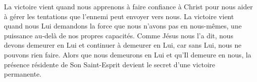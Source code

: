 La victoire vient quand nous apprenons à faire confiance à Christ
 pour nous aider à gérer les tentations que l'ennemi peut envoyer vers nous.
 La victoire vient quand nous Lui demandons la force
 que nous n'avons pas en nous-mêmes, une puissance au-delà
 de nos propres capacités.
 Comme Jésus nous l'a dit, nous devons demeurer en Lui
 et continuer à demeurer en Lui, car sans Lui, nous ne pouvons rien faire.
 Alors que nous demeurons en Lui et qu'Il demeure en nous,
 la présence résidente de Son Saint-Esprit
 devient le secret d'une victoire permanente.

\dvrule





